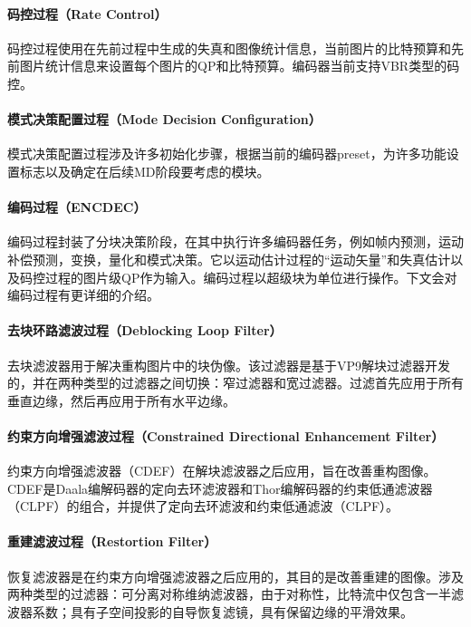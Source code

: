   \paragraph{码控过程（Rate Control）} 码控过程使用在先前过程中生成的失真和图像统计信息，当前图片的比特预算和先前图片统计信息来设置每个图片的QP和比特预算。编码器当前支持VBR类型的码控。

  \paragraph{模式决策配置过程（Mode Decision Configuration）} 模式决策配置过程涉及许多初始化步骤，根据当前的编码器preset，为许多功能设置标志以及确定在后续MD阶段要考虑的模块。

  \paragraph{编码过程（ENCDEC）} 编码过程封装了分块决策阶段，在其中执行许多编码器任务，例如帧内预测，​​运动补偿预测，变换，量化和模式决策。它以运动估计过程的“运动矢量”和失真估计以及码控过程的图片级QP作为输入。编码过程以超级块为单位进行操作。下文会对编码过程有更详细的介绍。

  \paragraph{去块环路滤波过程（Deblocking Loop Filter）} 去块滤波器用于解决重构图片中的块伪像。该过滤器是基于VP9解块过滤器开发的，并在两种类型的过滤器之间切换：窄过滤器和宽过滤器。过滤首先应用于所有垂直边缘，然后再应用于所有水平边缘。

  \paragraph{约束方向增强滤波过程（Constrained Directional Enhancement Filter）} 约束方向增强滤波器（CDEF）在解块滤波器之后应用，旨在改善重构图像。CDEF是Daala编解码器的定向去环滤波器和Thor编解码器的约束低通滤波器（CLPF）的组合，并提供了定向去环滤波和约束低通滤波（CLPF）。

  \paragraph{重建滤波过程（Restortion Filter）} 恢复滤波器是在约束方向增强滤波器之后应用的，其目的是改善重建的图像。涉及两种类型的过滤器：可分离对称维纳滤波器，由于对称性，比特流中仅包含一半滤波器系数；具有子空间投影的自导恢复滤镜，具有保留边缘的平滑效果。


